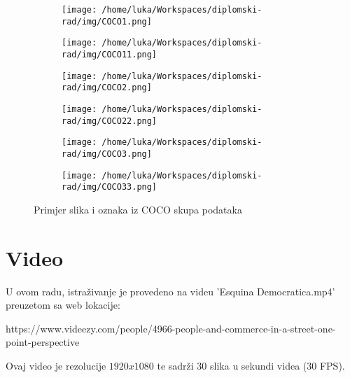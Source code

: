 \begin{figure}[htp]
	\centering
	\begin{subfigure}[b]{0.4\linewidth}
		\texttt{[image: /home/luka/Workspaces/diplomski-rad/img/COCO1.png]}
	\end{subfigure}
	\begin{subfigure}[b]{0.4\linewidth}
		\texttt{[image: /home/luka/Workspaces/diplomski-rad/img/COCO11.png]}
	\end{subfigure}
	\begin{subfigure}[b]{0.4\linewidth}
		\texttt{[image: /home/luka/Workspaces/diplomski-rad/img/COCO2.png]}
	\end{subfigure}
	\begin{subfigure}[b]{0.4\linewidth}
		\texttt{[image: /home/luka/Workspaces/diplomski-rad/img/COCO22.png]}
	\end{subfigure}
	\begin{subfigure}[b]{0.4\linewidth}
		\texttt{[image: /home/luka/Workspaces/diplomski-rad/img/COCO3.png]}
	\end{subfigure}
	\begin{subfigure}[b]{0.4\linewidth}
		\texttt{[image: /home/luka/Workspaces/diplomski-rad/img/COCO33.png]}
	\end{subfigure}
	\caption{Primjer slika i oznaka iz COCO skupa podataka}
	\label{img:coco-samples}
\end{figure}

\section{Video}

U ovom radu, istraživanje je provedeno na videu 'Esquina Democratica.mp4' preuzetom sa web lokacije:

https://www.videezy.com/people/4966-people-and-commerce-in-a-street-one-point-perspective

Ovaj video je rezolucije $1920x1080$ te sadrži 30 slika u sekundi videa (30 FPS).



